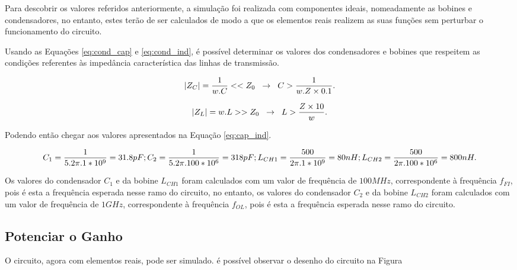 \documentclass[11pt]{article}
\numberwithin{equation}{section}
\begin{document}
Para descobrir os valores referidos anteriormente, a simulação foi realizada com componentes ideais, nomeadamente as bobines e condensadores, no entanto, estes terão de ser calculados de modo a que os elementos reais realizem as suas funções sem perturbar o funcionamento do circuito.

Usando as Equações \ref{eq:cond_cap} e \ref{eq:cond_ind}, é possível determinar os valores dos condensadores e bobines que respeitem as condições referentes às impedância característica das linhas de transmissão.

\begin{equation}
\lvert Z_C \rvert = \frac{1}{w.C} << Z_0 \hspace{2mm} \rightarrow \hspace{2mm} C > \frac{1}{w.Z \times 0.1}.
\label{eq:cond_cap}
\end{equation}

\begin{equation}
\lvert Z_L \rvert = w.L >> Z_0 \hspace{2mm} \rightarrow \hspace{2mm} L > \frac{Z \times 10}{w}.
\label{eq:cond_ind}
\end{equation}

Podendo então chegar aos valores apresentados na Equação \ref{eq:cap_ind}.

\begin{equation}
\centering
C_{1}=\frac{1}{5.2\pi.1*10^{9}}=31.8pF; C_{2}=\frac{1}{5.2\pi.100*10^{6}}=318pF; L_{CH1}=\frac{500}{2\pi.1*10^{9}}=80nH; L_{CH2}=\frac{500}{2\pi.100*10^{6}}=800nH.
\label{eq:cap_ind}
\end{equation}

Os valores do condensador $ C_{1} $ e da bobine $ L_{CH1} $ foram calculados com um valor de frequência de $ 100MHz $, correspondente à frequência $ f_{FI} $, pois é esta a frequência esperada nesse ramo do circuito, no entanto, os valores do condensador $ C_{2} $ e da bobine $ L_{CH2} $ foram calculados com um valor de frequência de $ 1GHz $, correspondente à frequência $ f_{OL} $, pois é esta a frequência esperada nesse ramo do circuito.

\subsection{Potenciar o Ganho}

O circuito, agora com elementos reais, pode ser simulado. é possível observar o desenho do circuito na Figura 
\end{document}
